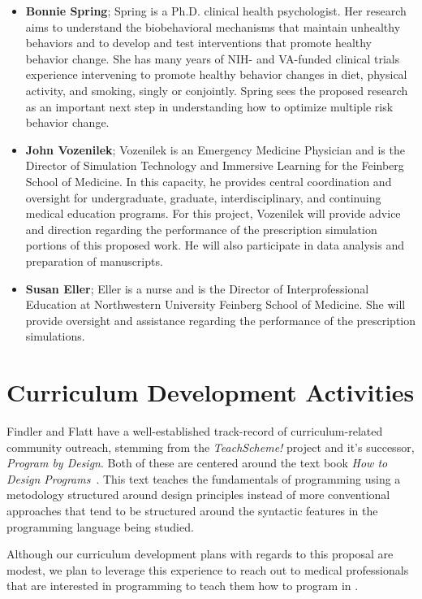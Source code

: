 \documentclass[11pt]{article}
\begin{document}
\begin{itemize}
\item\textbf{Bonnie Spring}; Spring is a Ph.D. clinical health
  psychologist. Her research aims to understand the biobehavioral
  mechanisms that maintain unhealthy behaviors and to develop and test
  interventions that promote healthy behavior change. She has many
  years of NIH- and VA-funded clinical trials experience intervening
  to promote healthy behavior changes in diet, physical activity, and
  smoking, singly or conjointly. Spring sees the proposed research as
  an important next step in understanding how to optimize multiple
  risk behavior change.

\item\textbf{John Vozenilek}; Vozenilek is an Emergency Medicine
  Physician and is the Director of Simulation Technology and Immersive
  Learning for the Feinberg School of Medicine. In this capacity, he
  provides central coordination and oversight for undergraduate,
  graduate, interdisciplinary, and continuing medical education
  programs. For this project, Vozenilek will provide advice and
  direction regarding the performance of the prescription simulation
  portions of this proposed work. He will also participate in data
  analysis and preparation of manuscripts.

\item\textbf{Susan Eller}; Eller is a nurse and is the Director of
  Interprofessional Education at Northwestern University Feinberg
  School of Medicine. She will provide oversight and assistance
  regarding the performance of the prescription simulations.

\end{itemize}

\section{Curriculum Development Activities}

Findler and Flatt have a well-established track-record of
curriculum-related community outreach, stemming from the
\textit{TeachScheme!} project and it's successor, \textit{Program by
  Design}. Both of these are centered around the text book \textit{How
  to Design Programs}~\citep{fffk:how-to-design-programs}.  This text
teaches the fundamentals of programming using a metodology structured
around design principles instead of more conventional approaches that
tend to be structured around the syntactic features in the programming
language being studied.

Although our curriculum development plans with regards to this
proposal are modest, we plan to leverage this experience to reach out
to medical professionals that are interested in programming to teach
them how to program in \poppl{}.
\end{document}
